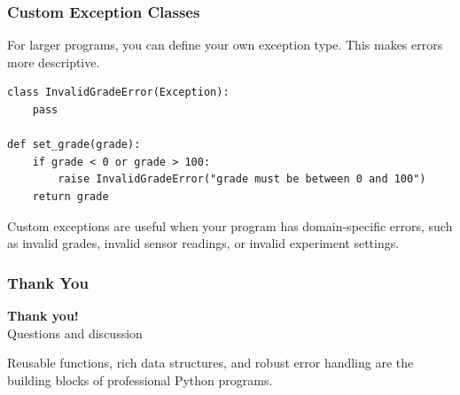 \documentclass[aspectratio=169,10pt]{beamer}
\begin{document}
\begin{frame}[fragile]
\frametitle{Custom Exception Classes}
\small
For larger programs, you can define your own exception type. This makes errors more descriptive.

\vspace{0.15cm}
\begin{lstlisting}[style=pycode]
class InvalidGradeError(Exception):
    pass

def set_grade(grade):
    if grade < 0 or grade > 100:
        raise InvalidGradeError("grade must be between 0 and 100")
    return grade
\end{lstlisting}

\begin{tcolorbox}[lecturebox,title=When useful]
Custom exceptions are useful when your program has domain-specific errors, such as invalid grades, invalid sensor readings, or invalid experiment settings.
\end{tcolorbox}
\end{frame}



\begin{frame}
\frametitle{Thank You}
\vspace{1.75cm}
\begin{center}
{\fontsize{34}{40}\selectfont \textbf{Thank you!}}\\[0.45cm]
{\fontsize{18}{22}\selectfont Questions and discussion}
\end{center}
\vspace{0.80cm}
\begin{tcolorbox}[lecturebox,title=Course takeaway]
Reusable functions, rich data structures, and robust error handling are the building blocks of professional Python programs.
\end{tcolorbox}
\end{frame}
\end{document}
